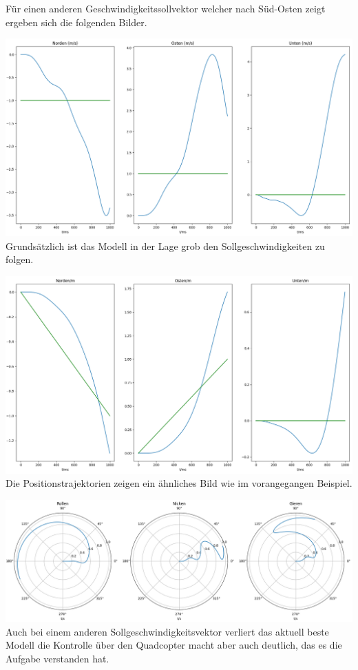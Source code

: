 Für einen anderen Geschwindigkeitssollvektor welcher nach Süd-Osten zeigt ergeben sich die folgenden Bilder.
\begin{center}
	\includegraphics[scale=0.25]{../images/0085 Ende-zu-Ende Nordgeschwindigkeit Ostgeschwindigkeit Untengeschwindigkeit.png}{\\Grundsätzlich ist das Modell in der Lage grob den Sollgeschwindigkeiten zu folgen.}
\end{center}
\begin{center}
	\includegraphics[scale=0.25]{../images/0084 Ende-zu-Ende Nord Ost Unten.png}{\\Die Positionstrajektorien zeigen ein ähnliches Bild wie im vorangegangen Beispiel.}
\end{center}
\begin{center}
	\includegraphics[scale=0.25]{../images/0086 Ende-zu-Ende Rolllage Nickrate Gierrate.png}{\\Auch bei einem anderen Sollgeschwindigkeitsvektor verliert das aktuell beste Modell die Kontrolle über den Quadcopter macht aber auch deutlich, das es die Aufgabe verstanden hat.}
\end{center}

